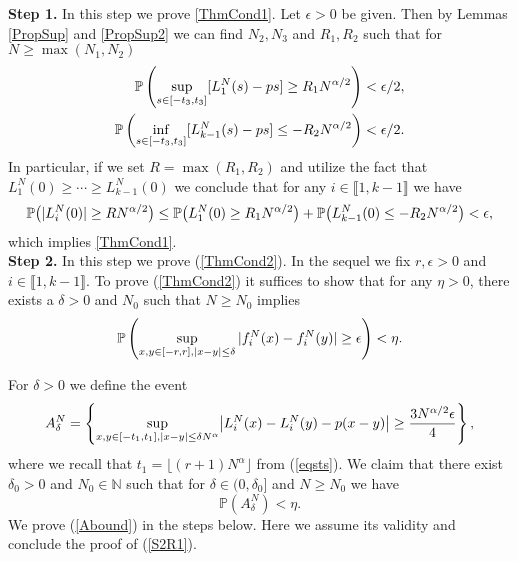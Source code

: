 \noindent\textbf{Step 1.} In this step we prove \eqref{ThmCond1}. Let $\epsilon > 0$ be given. Then by Lemmas \ref{PropSup} and \ref{PropSup2} we can find $N_2, N_3$ and $R_1, R_2$ such that for $N \geq \max(N_1, N_2)$
\begin{align*}
\mathbb{P}\left(\sup_{s\in[-t_3,t_3]} [L_1^N(s)-ps]\geq R_1N^{\alpha/2}\right)<\epsilon/2,\\
\mathbb{P}\left(\inf_{s\in[-t_3,t_3]}[L_{k-1}^N(s)-ps]\leq -R_2 N^{\alpha/2}\right)<\epsilon/2.
\end{align*}
In particular, if we set $R  = \max(R_1, R_2)$ and utilize the fact that $L_1^N(0) \geq \cdots \geq L_{k-1}^N(0)$ we conclude that for any $i \in \llbracket 1, k-1 \rrbracket$ we have
$$\mathbb{P}\big(|L_i^N(0)|\geq R N^{\alpha/2}\big)\leq \mathbb{P}\big(L_1^N(0)\geq R_1 N^{\alpha/2}\big) + \mathbb{P}\big(L_{k-1}^N(0)\leq -R_2N^{\alpha/2}\big) < \epsilon,$$
which implies \eqref{ThmCond1}.\\

\noindent\textbf{Step 2.} In this step we prove (\ref{ThmCond2}). In the sequel we fix $r, \epsilon > 0$ and $i \in \llbracket 1, k-1 \rrbracket$. To prove (\ref{ThmCond2}) it suffices to show that for any $\eta>0$, there exists a $\delta > 0$ and $N_0$ such that $N \geq N_0$ implies 
\begin{equation}\label{S2R1}
\mathbb{P}\left(\sup_{{x,y\in [-r,r], |x-y|\leq\delta}} |f^N_i(x) - f^N_i(y)| \geq \epsilon\right)<\eta.
\end{equation}

For $\delta > 0$ we define the event
\begin{equation}\label{Adelta}
A^N_\delta =\left\{\sup_{{x,y\in [-t_1,t_1], |x-y|\leq \delta N^\alpha}} \abs*{L_i^N(x)-L_i^N(y)-p(x-y)}\geq \frac{3N^{\alpha/2}\epsilon}4\right\},
\end{equation}
where we recall that $t_1 = \lfloor (r + 1)N^{\alpha} \rfloor$ from (\ref{eqsts}). We claim that there exist $\delta_0 > 0$ and $N_0 \in \mathbb{N}$ such that for $\delta \in (0, \delta_0]$ and $N \geq N_0$ we have
\begin{equation}\label{Abound}
\mathbb{P}(A^N_\delta) < \eta.
\end{equation}
We prove (\ref{Abound}) in the steps below. Here we assume its validity and conclude the proof of (\ref{S2R1}).\\


